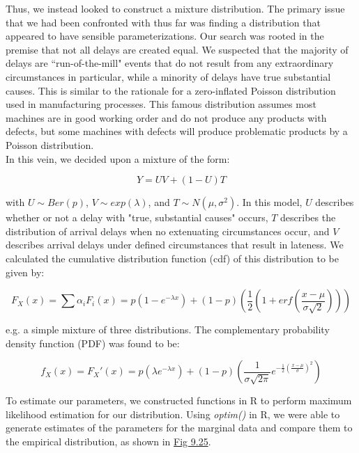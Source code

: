 \documentclass[12pt, a4paper, openany]{book}
\newcommand\tab[1][1cm]{\hspace*{#1}}
\begin{document}
	\tab Thus, we instead looked to construct a mixture distribution. The primary issue that we had been confronted with thus far was finding a distribution that appeared to have sensible parameterizations.  Our search was rooted in the premise that not all delays are created equal. We suspected that the majority of delays are “run-of-the-mill" events that do not result from any extraordinary circumstances in particular, while a minority of delays have true substantial causes. This is similar to the rationale for a zero-inflated Poisson distribution used in manufacturing processes. This famous distribution assumes most machines are in good working order and do not produce any products with defects, but some machines with defects will produce problematic products by a Poisson distribution. \\
	\tab In this vein, we decided upon a mixture of the form: \begin{center}$$Y = UV + (1-U)T$$\end{center} with $U\sim Ber(p)$, $V\sim exp(\lambda)$, and $T\sim  N(\mu,\sigma^2)$. In this model, $U$ describes whether or not a delay with "true, substantial causes" occurs, $T$ describes the distribution of arrival delays when no extenuating circumstances occur, and $V$ describes arrival delays under defined circumstances that result in lateness. We calculated the cumulative distribution function (cdf) of this distribution to be given by: 
	\begin{center}$$F_X(x) = \sum \alpha_i F_i(x) = p(1-e^{-\lambda x}) + (1-p)\left(\frac{1}{2}(1+ erf(\frac{x-\mu}{\sigma\sqrt{2}}))\right)$$\end{center}
	e.g. a simple mixture of three distributions. The complementary probability density function (PDF) was found to be: \begin{center}
	$$f_X(x) = F_X'(x) = p(\lambda e^{-\lambda x} ) + (1-p)\left(\frac{1}{\sigma \sqrt{2\pi}} e^{-\frac{1}{2}(\frac{x-\mu}{\sigma})^2}\right)$$
	\end{center}
	To estimate our parameters, we constructed functions in R to perform maximum likelihood estimation for our distribution.  Using \textit{optim()} in R, we were able to generate estimates of the parameters for the marginal data and compare them to the empirical distribution, as shown in \underline{Fig 9.25}.\\
\end{document}
